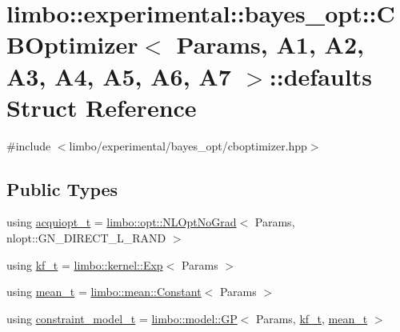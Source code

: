 \hypertarget{structlimbo_1_1experimental_1_1bayes__opt_1_1_c_b_optimizer_1_1defaults}{}\section{limbo\+:\+:experimental\+:\+:bayes\+\_\+opt\+:\+:C\+B\+Optimizer$<$ Params, A1, A2, A3, A4, A5, A6, A7 $>$\+:\+:defaults Struct Reference}
\label{structlimbo_1_1experimental_1_1bayes__opt_1_1_c_b_optimizer_1_1defaults}


{\ttfamily \#include $<$limbo/experimental/bayes\+\_\+opt/cboptimizer.\+hpp$>$}

\subsection*{Public Types}
\begin{DoxyCompactItemize}
\item 
using \hyperlink{structlimbo_1_1experimental_1_1bayes__opt_1_1_c_b_optimizer_1_1defaults_a4c7662e52d7a08fab22774eae4cb5822}{acquiopt\+\_\+t} = \hyperlink{structlimbo_1_1opt_1_1_n_l_opt_no_grad}{limbo\+::opt\+::\+N\+L\+Opt\+No\+Grad}$<$ Params, nlopt\+::\+G\+N\+\_\+\+D\+I\+R\+E\+C\+T\+\_\+\+L\+\_\+\+R\+A\+N\+D $>$
\item 
using \hyperlink{structlimbo_1_1experimental_1_1bayes__opt_1_1_c_b_optimizer_1_1defaults_aa9c7a3f40bfc804bb27aff96a162ccaf}{kf\+\_\+t} = \hyperlink{structlimbo_1_1kernel_1_1_exp}{limbo\+::kernel\+::\+Exp}$<$ Params $>$
\item 
using \hyperlink{structlimbo_1_1experimental_1_1bayes__opt_1_1_c_b_optimizer_1_1defaults_a102b232d75c97267704fa717bdeb8a9f}{mean\+\_\+t} = \hyperlink{structlimbo_1_1mean_1_1_constant}{limbo\+::mean\+::\+Constant}$<$ Params $>$
\item 
using \hyperlink{structlimbo_1_1experimental_1_1bayes__opt_1_1_c_b_optimizer_1_1defaults_a732a30715b9697aad5c6587cca6acfd3}{constraint\+\_\+model\+\_\+t} = \hyperlink{classlimbo_1_1model_1_1_g_p}{limbo\+::model\+::\+G\+P}$<$ Params, \hyperlink{structlimbo_1_1experimental_1_1bayes__opt_1_1_c_b_optimizer_1_1defaults_aa9c7a3f40bfc804bb27aff96a162ccaf}{kf\+\_\+t}, \hyperlink{structlimbo_1_1experimental_1_1bayes__opt_1_1_c_b_optimizer_1_1defaults_a102b232d75c97267704fa717bdeb8a9f}{mean\+\_\+t} $>$
\end{DoxyCompactItemize}


